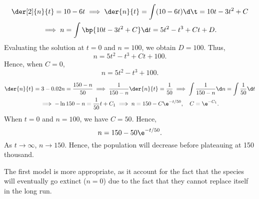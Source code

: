 \begin{solution}
    \begin{ppart}
        \begin{gather*}
            \der[2]{n}{t} = 10 - 6t \implies \der{n}{t} = \int (10 - 6t) \d \t = 10t - 3t^2 + C\\
            \implies n = \int \bp{10t - 3t^2 + C} \d t = 5t^2 - t^3 + C t + D.
        \end{gather*}
        Evaluating the solution at $t = 0$ and $n = 100$, we obtain $D = 100$. Thus, \[n = 5t^2 - t^3 + Ct + 100.\] Hence, when $C = 0$, \[n = 5t^2 - t^3 + 100.\]

        \begin{center}
        \end{center}
    \end{ppart}
    \begin{ppart}
        \begin{gather*}
            \der{n}{t} = 3 - 0.02n = \frac{150 - n}{50} \implies \frac{1}{150-n} \der{n}{t} = \frac1{50} 
            \implies \int \frac{1}{150-n} \d n = \int \frac1{50} \d t\\
            \implies -\ln{150 - n} = \frac1{50} t + C_1  \implies n = 150 - C\e^{-t/50}, \quad C = \e^{-C_1}.
        \end{gather*}
        When $t = 0$ and $n = 100$, we have $C = 50$. Hence, \[n = 150 - 50\e^{-t/50}.\] As $t \to \infty$, $n \to 150$. Hence, the population will decrease before plateauing at 150 thousand.
    \end{ppart}
    
    The first model is more appropriate, as it account for the fact that the species will eventually go extinct ($n = 0$) due to the fact that they cannot replace itself in the long run.
\end{solution}


